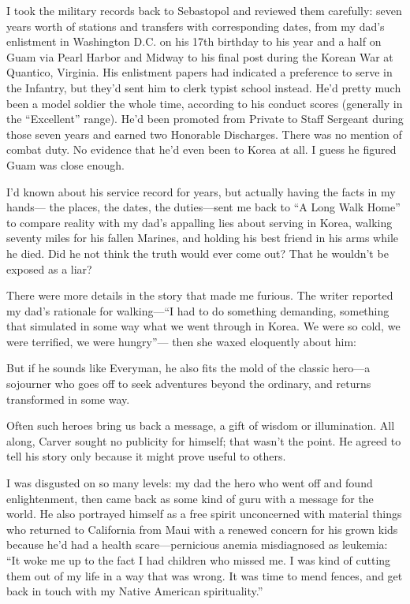 \documentclass[12pt]{book}
\begin{document}
I took the military records back to Sebastopol and reviewed them carefully: seven years worth of stations and transfers with corresponding dates, from my dad's enlistment in Washington D.C. on his 17th birthday to his year and a half on Guam via Pearl Harbor and Midway to his final post during the Korean War at Quantico, Virginia. His enlistment papers had indicated a preference to serve in the Infantry, but they'd sent him to clerk typist school instead. He'd pretty much been a model soldier the whole time, according to his conduct scores (generally in the ``Excellent'' range). He'd been promoted from Private to Staff Sergeant during those seven years and earned two Honorable Discharges. There was no mention of combat duty. No evidence that he'd even been to Korea at all. I guess he figured Guam was close enough.

I'd known about his service record for years, but actually having the facts in my hands--- the places, the dates, the duties---sent me back to ``A Long Walk Home'' to compare reality with my dad's appalling lies about serving in Korea, walking seventy miles for his fallen Marines, and holding his best friend in his arms while he died. Did he not think the truth would ever come out? That he wouldn't be exposed as a liar?

There were more details in the story that made me furious. The writer reported my dad's rationale for walking---``I had to do something demanding, something that simulated in some way what we went through in Korea. We were so cold, we were terrified, we were hungry''--- then she waxed eloquently about him:

But if he sounds like Everyman, he also fits the mold of the classic hero---a sojourner who goes off to seek adventures beyond the ordinary, and returns transformed in some way.

Often such heroes bring us back a message, a gift of wisdom or illumination. All along, Carver sought no publicity for himself; that wasn't the point. He agreed to tell his story only because it might prove useful to others.

I was disgusted on so many levels: my dad the hero who went off and found enlightenment, then came back as some kind of guru with a message for the world. He also portrayed himself as a free spirit unconcerned with material things who returned to California from Maui with a renewed concern for his grown kids because he'd had a health scare---pernicious anemia misdiagnosed as leukemia: ``It woke me up to the fact I had children who missed me. I was kind of cutting them out of my life in a way that was wrong. It was time to mend fences, and get back in touch with my Native American spirituality.''
\end{document}
